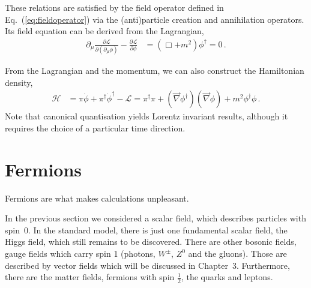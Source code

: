 \documentclass[12pt]{report}
\renewcommand{\L}{\ensuremath{\mathscr{L}}}
\newcommand{\2}{\ensuremath{\sqrt{2}\,}}
\renewcommand{\L}{\ensuremath{\mathscr{L}}}
\begin{document}
{      These relations are satisfied by the field operator defined in Eq.~(\ref{eq:fieldoperator})
      via the (anti)particle creation and annihilation operators. Its field equation can be derived
      from the Lagrangian,
      \begin{align}
        \partial_\mu \frac{\partial \L}{\partial(\partial_\mu \phi)} -\frac{\partial \L}{\partial
          \phi}&=\left(\Box+m^2\right) \phi^\dagger =0 \,.      
      \end{align}
      
      From the Lagrangian and the momentum, we can also construct the Hamiltonian density, 
      \begin{align}
        \mathscr{H}&= \pi \dot{\phi} +\pi^\dagger \dot{\phi}^\dagger- \L = \pi^\dagger \pi
        +\left(\vec{\nabla} \phi^\dagger\right)\left(\vec{\nabla} \phi\right) +m^2\phi^\dagger
        \phi\,. 
      \end{align}
      Note that canonical quantisation yields Lorentz invariant results,
      although it requires the choice of a particular time direction.
    


    \section{Fermions}
      Fermions are what makes calculations unpleasant.

      In the previous section we considered a scalar field, which describes particles with spin~0.
      In the standard model, there is just one fundamental scalar field, the Higgs field, which still
      remains to be discovered. There are other bosonic fields, gauge fields which carry spin 1
      (photons, $W^\pm$, $Z^0$ and the gluons). Those are described by vector fields which 
      will be discussed in Chapter~3. Furthermore, there are the matter fields, fermions with spin
      $\frac{1}{2}$, the quarks and leptons. 

}
\end{document}
